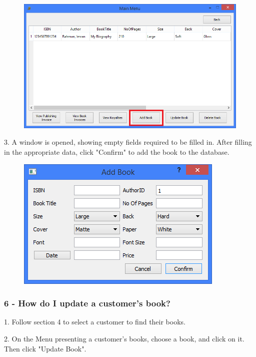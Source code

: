 \begin{figure}[H]
    \includegraphics[width=\textwidth]{./Manual/Tutorial/Q5/AddBook.png}
\end{figure}

3. A window is opened, showing empty fields required to be filled in. After filling in the appropriate data, click "Confirm" to add the book to the database.

\begin{figure}[H]
    \includegraphics[width=\textwidth]{./Manual/Tutorial/Q5/AddBookWindow.png}
\end{figure}

\subsubsection{6 -  How do I update a customer's book?} \label{sssec:Q6}

1. Follow section 4 to select a customer to find their books.

2. On the Menu presenting a customer's books, choose a book, and click on it. Then click "Update Book".

